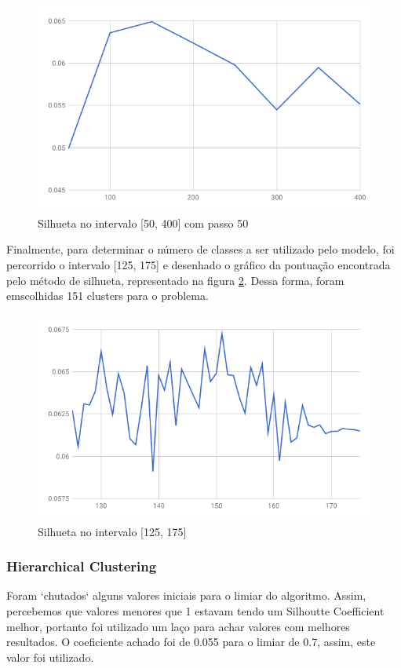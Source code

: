 \documentclass[conference]{IEEEtran}
\begin{document}
\begin{figure}[H]
  \includegraphics[scale=0.4, center]{silhouette1.png}
  \caption{Silhueta no intervalo [50, 400] com passo 50}
  \label{fig:sil1}
\end{figure}

Finalmente, para determinar o número de classes a ser utilizado pelo modelo, foi percorrido o intervalo [125, 175] e desenhado o gráfico da pontuação encontrada pelo método de silhueta, representado na figura \ref{fig:sil2}. Dessa forma, foram emscolhidas 151 clusters para o problema. 

\begin{figure}[H]
  \includegraphics[scale=0.4, center]{silhouette2.png}
  \caption{Silhueta no intervalo [125, 175]}
  \label{fig:sil2}
\end{figure}


\subsubsection{Hierarchical Clustering}
Foram `chutados`  alguns valores iniciais para o limiar do algoritmo. Assim, percebemos que valores menores que 1 estavam tendo um Silhoutte Coefficient melhor, portanto foi utilizado um laço para achar valores com melhores resultados. O coeficiente achado foi de 0.055 para o limiar de 0.7, assim, este valor foi utilizado.
\end{document}
